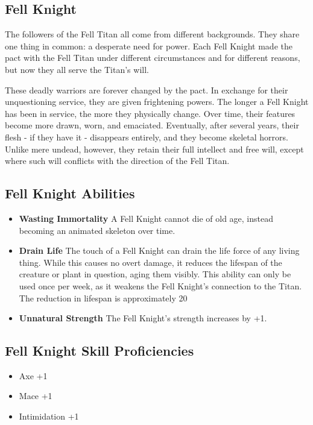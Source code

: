\begin{multicols}{2}
\section{Fell Knight}

The followers of the Fell Titan all come from different backgrounds. 
They share one thing in common: a desperate need for power. Each Fell 
Knight made the pact with the Fell Titan under different circumstances 
and for different reasons, but now they all serve the Titan's will.

These deadly warriors are forever changed by the pact. In exchange for 
their unquestioning service, they are given frightening powers. The longer 
a Fell Knight has been in service, the more they physically change. Over 
time, their features become more drawn, worn, and emaciated. Eventually, 
after several years, their flesh - if they have it - disappears entirely, 
and they become skeletal horrors. Unlike mere undead, however, they retain 
their full intellect and free will, except where such will conflicts with 
the direction of the Fell Titan.

\subsection{Fell Knight Abilities}

\begin{itemize}
    \item \textbf{Wasting Immortality} A Fell Knight cannot die of old age, 
    instead becoming an animated skeleton over time.
    \item \textbf{Drain Life} The touch of a Fell Knight can drain the life 
    force of any living thing. While this causes no overt damage, it reduces 
    the lifespan of the creature or plant in question, aging them visibly. 
    This ability can only be used once per week, as it weakens the Fell 
    Knight's connection to the Titan. The reduction in lifespan is
    approximately 20%
    \item \textbf{Unnatural Strength} The Fell Knight's strength increases by +1.
\end{itemize}

\subsection{Fell Knight Skill Proficiencies}

\begin{itemize}
    \item Axe +1
    \item Mace +1
    \item Intimidation +1
\end{itemize}


\end{multicols}
